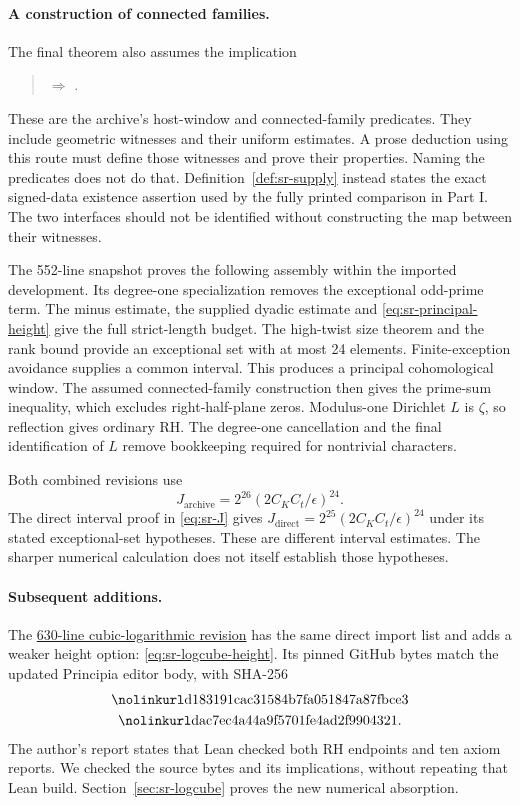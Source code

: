 \paragraph{A construction of connected families.}
The final theorem also assumes the implication
\begin{quote}\raggedright
{}
\(\Longrightarrow\)
.
\end{quote}
These are the archive's host-window and connected-family predicates.
They include geometric witnesses and their uniform estimates.
A prose deduction using this route must define those witnesses and prove
their properties. Naming the predicates does not do that.
Definition~\ref{def:sr-supply} instead states the exact signed-data
existence assertion used by the fully printed comparison in Part I.
The two interfaces should not be identified without constructing the
map between their witnesses.

The 552-line snapshot proves the following assembly within the imported
development. Its degree-one specialization removes the exceptional
odd-prime term. The minus estimate, the supplied dyadic estimate and
\eqref{eq:sr-principal-height} give the full strict-length budget.
The high-twist size theorem and the rank bound provide an exceptional
set with at most 24 elements. Finite-exception avoidance supplies a
common interval. This produces a principal cohomological window.
The assumed connected-family construction then gives the prime-sum
inequality, which excludes right-half-plane zeros. Modulus-one
Dirichlet \(L\) is \(\zeta\), so reflection gives ordinary RH.
The degree-one cancellation and the final identification of \(L\)
remove bookkeeping required for nontrivial characters.

Both combined revisions use
\[
 J_{\mathrm{archive}}=2^{26}(2C_KC_t/\epsilon)^{24}.
\]
The direct interval proof in \eqref{eq:sr-J} gives
\(J_{\mathrm{direct}}=2^{25}(2C_KC_t/\epsilon)^{24}\) under its
stated exceptional-set hypotheses.
These are different interval estimates. The sharper numerical
calculation does not itself establish those hypotheses.

\paragraph{Subsequent additions.}
The
\href{https://github.com/antoshashakov/riemann-hypothesis/blob/d85b449fa08d46836c934a7809fe3c9cae2e4a6a/verification/LogCubeRH.lean}{630-line cubic-logarithmic revision}
has the same direct import list and adds a weaker height option:
\eqref{eq:sr-logcube-height}.
Its pinned GitHub bytes match the updated Principia editor body,
with SHA-256
\[
 \begin{gathered}
 \srcid{d183191cac31584b7fa051847a87fbce3}\\
 \srcid{dac7ec4a44a9f5701fe4ad2f9904321}.
 \end{gathered}
\]
The author's report states that Lean checked both RH endpoints and
ten axiom reports. We checked the source bytes and its implications,
without repeating that Lean build.
Section~\ref{sec:sr-logcube} proves the new numerical absorption.

